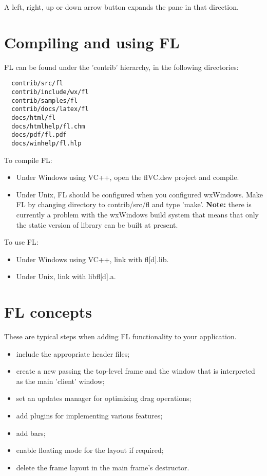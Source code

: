 A left, right, up or down arrow button expands the pane in that direction.


\section{Compiling and using FL}

FL can be found under the 'contrib' hierarchy, in the following directories:

\begin{verbatim}
  contrib/src/fl
  contrib/include/wx/fl
  contrib/samples/fl
  contrib/docs/latex/fl
  docs/html/fl
  docs/htmlhelp/fl.chm
  docs/pdf/fl.pdf
  docs/winhelp/fl.hlp
\end{verbatim}

To compile FL:

\begin{itemize}\itemsep=0pt
\item Under Windows using VC++, open the flVC.dsw project
and compile.
\item Under Unix, FL should be configured when you configured
wxWindows. Make FL by changing directory to contrib/src/fl and
type 'make'. {\bf Note:} there is currently a
problem with the wxWindows build system that means that
only the static version of library can be built at present.
\end{itemize}

To use FL:

\begin{itemize}\itemsep=0pt
\item Under Windows using VC++, link with fl[d].lib.
\item Under Unix, link with libfl[d].a.
\end{itemize}

\section{FL concepts}

These are typical steps when adding FL functionality to your application.

\begin{itemize}\itemsep=0pt
\item include the appropriate header files;
\item create a new  passing the top-level frame and the window that
is interpreted as the main 'client' window;
\item set an updates manager for optimizing drag operations;
\item add plugins for implementing various features;
\item add bars;
\item enable floating mode for the layout if required;
\item delete the frame layout in the main frame's destructor.
\end{itemize}


